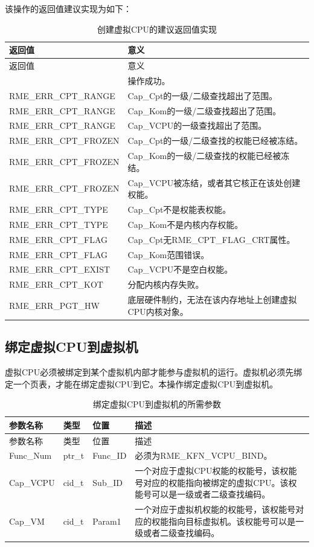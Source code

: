该操作的返回值建议实现为如下：

\begin{xltabular}{\textwidth}{@{}>{\hsize\raggedright\arraybackslash}X>{\hsize\raggedright\arraybackslash}X@{}}
\caption{创建虚拟CPU的建议返回值实现}\label{tab:8-82-create-virtual-cpu-suggested-return-values}\\
\toprule
返回值 & 意义\tabularnewline
\endfirsthead
\toprule
返回值 & 意义\tabularnewline
\midrule
\endhead
\bottomrule
{} & 操作成功。\tabularnewline
    RME\_ERR\_CPT\_RANGE & Cap\_Cpt的一级/二级查找超出了范围。\tabularnewline
    RME\_ERR\_CPT\_RANGE & Cap\_Kom的一级/二级查找超出了范围。\tabularnewline
    RME\_ERR\_CPT\_RANGE & Cap\_VCPU的一级查找超出了范围。\tabularnewline
    RME\_ERR\_CPT\_FROZEN & Cap\_Cpt的一级/二级查找的权能已经被冻结。\tabularnewline
    RME\_ERR\_CPT\_FROZEN & Cap\_Kom的一级/二级查找的权能已经被冻结。\tabularnewline
    RME\_ERR\_CPT\_FROZEN & Cap\_VCPU被冻结，或者其它核正在该处创建权能。\tabularnewline
    RME\_ERR\_CPT\_TYPE & Cap\_Cpt不是权能表权能。\tabularnewline
    RME\_ERR\_CPT\_TYPE & Cap\_Kom不是内核内存权能。\tabularnewline
    RME\_ERR\_CPT\_FLAG & Cap\_Cpt无RME\_CPT\_FLAG\_CRT属性。\tabularnewline
    RME\_ERR\_CPT\_FLAG & Cap\_Kom范围错误。\tabularnewline
    RME\_ERR\_CPT\_EXIST & Cap\_VCPU不是空白权能。\tabularnewline
    RME\_ERR\_CPT\_KOT & 分配内核内存失败。\tabularnewline
    RME\_ERR\_PGT\_HW & 底层硬件制约，无法在该内存地址上创建虚拟CPU内核对象。\tabularnewline
\end{xltabular}

\subsection{绑定虚拟CPU到虚拟机}\label{subsec:8-bind-virtual-cpu-to-virtual-machine}

虚拟CPU必须被绑定到某个虚拟机内部才能参与虚拟机的运行。虚拟机必须先绑定一个页表，才能在绑定虚拟CPU到它。本操作绑定虚拟CPU到虚拟机。

\begin{xltabular}{\textwidth}{@{}>{\hsize\raggedright\arraybackslash}X>{\hsize\raggedright\arraybackslash}X>{\hsize\raggedright\arraybackslash}X>{\hsize\raggedright\arraybackslash}X@{}}
\caption{绑定虚拟CPU到虚拟机的所需参数}\label{tab:8-83-bind-virtual-cpu-to-virtual-machine-parameters}\\
\toprule
参数名称 & 类型 & 位置 & 描述\tabularnewline
\endfirsthead
\toprule
参数名称 & 类型 & 位置 & 描述\tabularnewline
\midrule
\endhead
\bottomrule
\endlastfoot
Func\_Num & ptr\_t & Func\_ID &
必须为RME\_KFN\_VCPU\_BIND。\tabularnewline
Cap\_VCPU & cid\_t & Sub\_ID &
一个对应于虚拟CPU权能的权能号，该权能号对应的权能指向被绑定的虚拟CPU。该权能号可以是一级或者二级查找编码。\tabularnewline
Cap\_VM & cid\_t & Param1 &
一个对应于虚拟机权能的权能号，该权能号对应的权能指向目标虚拟机。该权能号可以是一级或者二级查找编码。\tabularnewline
\end{xltabular}

